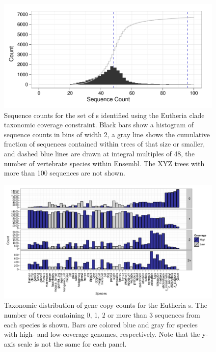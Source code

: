 \begin{figure}[ht]
\centering
\includegraphics[scale=0.9]{Figs/ensembl_euth_hist.pdf}
\caption{Sequence counts for the set of \subtr{}s identified using the
  Eutheria clade taxonomic coverage constraint. Black bars show a
  histogram of sequence counts in bins of width 2, a gray line shows
  the cumulative fraction of sequences contained within trees of that
  size or smaller, and dashed blue lines are drawn at integral
  multiples of 48, the number of vertebrate species within
  Ensembl. The XYZ trees with more than 100 sequences are not shown.}
\label{ensembl_euth_hist}
\end{figure}



\begin{landscape}
\begin{figure}[ht]
\centering
\includegraphics[scale=0.9]{Figs/ortholog_euth_dups.pdf}
\caption{Taxonomic distribution of gene copy counts for the Eutheria
  \subtr{}s. The number of trees containing 0, 1, 2 or more than 3
  sequences from each species is shown. Bars are colored blue and gray
  for species with high- and low-coverage genomes, respectively. Note
  that the y-axis scale is not the same for each panel.}
\label{ortholog_euth_dups}
\end{figure}
\end{landscape}

